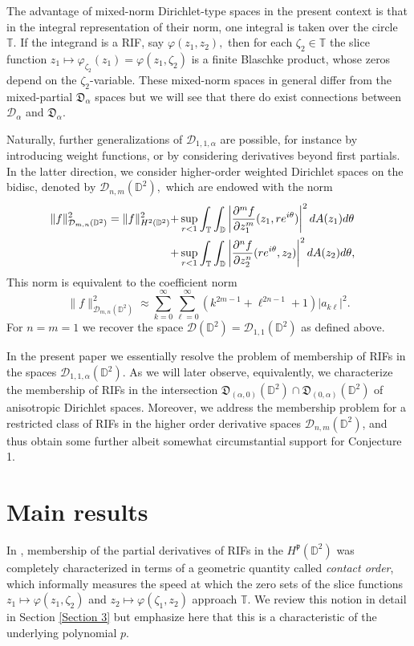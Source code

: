 \documentclass[11pt]{amsart}
\numberwithin{equation}{section}
\begin{document}
The advantage of mixed-norm Dirichlet-type spaces in the present context is that in the integral representation of their norm, one integral is taken over the circle $\mathbb{T}.$ If the integrand is a RIF, say $\varphi(z_1,z_2),$ then for each $\zeta_2\in \mathbb{T}$ the slice function $z_1\mapsto \varphi_{\zeta_2}(z_1)=\varphi(z_1,\zeta_2)$ is a finite Blaschke product, whose zeros depend on the $\zeta_2$-variable. These mixed-norm spaces in general differ from the mixed-partial $\mathfrak{D}_\alpha$ spaces but we will see that there do exist connections between $\mathcal{D}_\alpha$ and $\mathfrak{D}_\alpha.$ 

Naturally, further generalizations of $\mathcal{D}_{1,1,\alpha}$ are possible, for instance by introducing weight functions, or by considering derivatives beyond first partials. In the latter direction, we consider higher-order weighted Dirichlet spaces on the bidisc, denoted by $\mathcal{D}_{n,m}(\mathbb{D}^2),$ which are endowed with the norm
\begin{align}
\|f\|^2_{\mathcal{D}_{m,n}(\mathbb{D}^2)}=\|f\|_{H^2(\mathbb{D}^2)}^2+&\sup_{r<1}\int_{\mathbb{T}}\int_{\mathbb{D}}\left|\frac{\partial^m f}{\partial z_1^m}(z_1,re^{i\theta})\right|^2dA(z_1)d\theta&&\\+&\sup_{r<1}\int_{\mathbb{T}}\int_{\mathbb{D}}\left|\frac{\partial^n f}{\partial z_2^n}(re^{i\theta},z_2)\right|^2dA(z_2)d\theta, \notag
\end{align}
This norm is equivalent to the coefficient norm
$$\|f\|^2_{\mathcal{D}_{m,n}(\mathbb{D}^2)}\approx \sum_{k=0}^{\infty}\sum_{\ell=0}^{\infty}(k^{2m-1}+\ell^{2n-1}+1)|a_{k\ell}|^2.$$
For $n=m=1$ we recover the space $\mathcal{D}(\mathbb{D}^2)=\mathcal{D}_{1,1}(\mathbb{D}^2)$ as defined above.

In the present paper we essentially resolve the problem of membership of RIFs in the spaces $\mathcal{D}_{1,1,\alpha}(\mathbb{D}^2)$. As we will later observe, equivalently, we characterize the membership of RIFs in the intersection $\mathfrak{D}_{(\alpha,0)}(\mathbb{D}^2)\cap \mathfrak{D}_{(0,\alpha)}(\mathbb{D}^2)$ of anisotropic Dirichlet spaces. Moreover, we address the membership problem for a restricted class of RIFs in the higher order derivative spaces $\mathcal{D}_{n,m}(\mathbb{D}^2)$, and thus obtain some further albeit somewhat circumstantial support for Conjecture 1.  


\section{Main results} \label{section 2}
In \cite{PLMS}, membership of the partial derivatives of RIFs in the $H^{\mathfrak{p}}(\mathbb{D}^2)$ was completely characterized in terms of a geometric quantity called \textit{contact order}, which informally measures the speed at which the zero sets of the slice functions $z_1\mapsto \varphi(z_1,\zeta_2)$ and $z_2\mapsto \varphi(\zeta_1,z_2)$ approach $\mathbb{T}$. We review this notion in detail in Section \ref{Section 3} but emphasize here that this is a characteristic of the underlying polynomial $p$.
\end{document}
